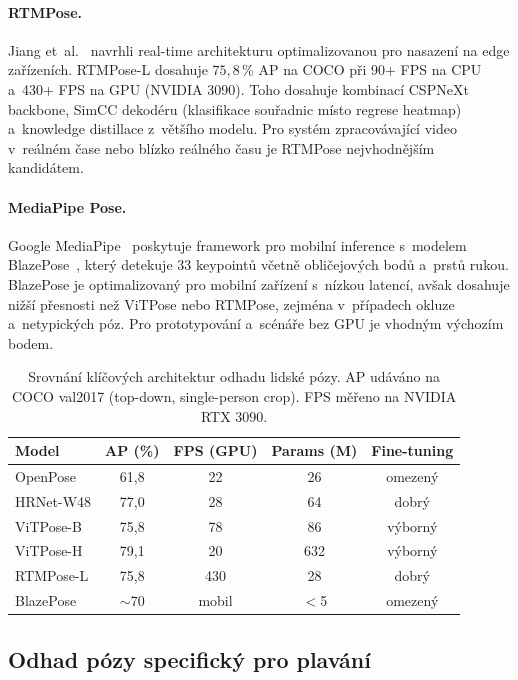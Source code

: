 \paragraph{RTMPose.}
Jiang et~al.~\cite{jiang2023rtmpose} navrhli real-time architekturu optimalizovanou pro nasazení na edge zařízeních. RTMPose-L dosahuje $75{,}8$\,\% AP na COCO při 90+ FPS na CPU a~430+ FPS na GPU (NVIDIA 3090). Toho dosahuje kombinací CSPNeXt backbone, SimCC dekodéru (klasifikace souřadnic místo regrese heatmap) a~knowledge distillace z~většího modelu. Pro systém zpracovávající video v~reálném čase nebo blízko reálného času je RTMPose nejvhodnějším kandidátem.

\paragraph{MediaPipe Pose.}
Google MediaPipe~\cite{mediapipe2019} poskytuje framework pro mobilní inference s~modelem BlazePose~\cite{blazepose2020}, který detekuje 33 keypointů včetně obličejových bodů a~prstů rukou. BlazePose je optimalizovaný pro mobilní zařízení s~nízkou latencí, avšak dosahuje nižší přesnosti než ViTPose nebo RTMPose, zejména v~případech okluze a~netypických póz. Pro prototypování a~scénáře bez GPU je vhodným výchozím bodem.

\begin{table}[htbp]
\centering
\caption{Srovnání klíčových architektur odhadu lidské pózy. AP udáváno na COCO val2017 (top-down, single-person crop). FPS měřeno na NVIDIA RTX 3090.}
\label{tab:pe_srovnani}
\small
\begin{tabular}{lcccc}
\toprule
\textbf{Model} & \textbf{AP (\%)} & \textbf{FPS (GPU)} & \textbf{Params (M)} & \textbf{Fine-tuning} \\
\midrule
OpenPose        & 61,8 & 22  & 26   & omezený \\
HRNet-W48       & 77,0 & 28  & 64   & dobrý \\
ViTPose-B       & 75,8 & 78  & 86   & výborný \\
ViTPose-H       & 79,1 & 20  & 632  & výborný \\
RTMPose-L       & 75,8 & 430 & 28   & dobrý \\
BlazePose       & $\sim$70 & mobil & $<$5 & omezený \\
\bottomrule
\end{tabular}
\end{table}

\subsection{Odhad pózy specifický pro plavání}
\label{subsec:pe_plavani}

